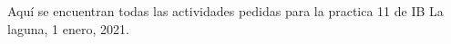 Aquí se encuentran todas las actividades pedidas para la practica 11 de IB La laguna, 1 enero, 2021. 